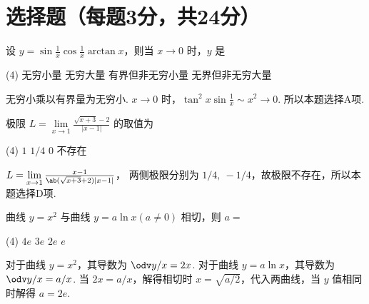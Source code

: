 \section{选择题（每题3分，共24分）}

\begin{problem}
  设 $y = \sin\frac1x \cos\frac1x \arctan x$，则当 $x \to 0$ 时，$y$ 是
  \begin{tasks}(4)
    \task[\true] 无穷小量
    \task 无穷大量
    \task 有界但非无穷小量
    \task 无界但非无穷大量
  \end{tasks}
\end{problem}
\scratch[4ex]
\begin{solution}
  无穷小乘以有界量为无穷小. $x \to 0$ 时，$\tan^2x \sin\frac1x \sim x^2 \to 0$.
  所以本题选择A项.
\end{solution}

\begin{problem}
  极限 $L = \lim\limits_{x \to 1} \frac{\sqrt{x + 3} - 2}{|x - 1|}$ 的取值为
  \begin{tasks}(4)
    \task $1$
    \task $1/4$
    \task $0$
    \task[\true] 不存在
  \end{tasks}
\end{problem}
\scratch[6ex]
\begin{solution}
  $L = \lim\limits_{x \to 1} \frac{x - 1}{\ab(\sqrt{x + 3} + 2)|x - 1|}$，
  两侧极限分别为 $1/4,~ -1/4$，故极限不存在，所以本题选择D项.
\end{solution}

\begin{problem}
  曲线 $y = x^2$ 与曲线 $y = a\ln x (a \neq 0)$ 相切，则 $a = $
  \begin{tasks}(4)
    \task $4e$
    \task $3e$
    \task[\true] $2e$
    \task $e$
  \end{tasks}
\end{problem}
\scratch[6ex]
\begin{solution}
  对于曲线 $y = x^2 $，其导数为 $\odv y/x = 2x$.
  对于曲线 $y = a \ln x $，其导数为 $\odv y/x = a/x$.
  当 $2x = a/x$，解得相切时 $x = \sqrt{a/2}$，代入两曲线，当 $y$ 值相同时解得 $a = 2e$.
\end{solution}

